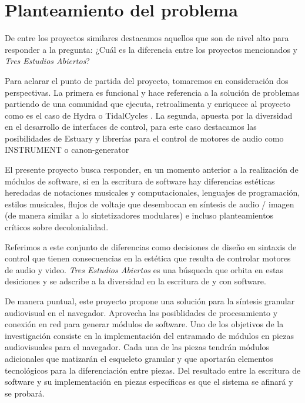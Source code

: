 \section*{Planteamiento del problema}

De entre los proyectos similares destacamos aquellos que son de nivel alto para responder a la pregunta: ¿Cuál es la diferencia entre los proyectos mencionados y \textit{Tres Estudios Abiertos}?

Para aclarar el punto de partida del proyecto, tomaremos en consideración dos perspectivas. La primera es funcional y hace referencia a la solución de problemas partiendo de una comunidad que ejecuta, retroalimenta y enriquece al proyecto como es el caso de Hydra \citep{hydra} o TidalCycles \citep{tidal}. La segunda, apuesta por la diversidad en el desarrollo de interfaces de control, para este caso destacamos las posibilidades de Estuary \citep{estuary} y librerías para el control de motores de audio como INSTRUMENT \citep{instrument} o canon-generator \citep{canongenerator}

El presente proyecto busca responder, en un momento anterior a la realización de módulos de software, si en la escritura de software hay diferencias estéticas heredadas de notaciones musicales y computacionales, lenguajes de programación,  estilos musicales, flujos de voltaje que desembocan en síntesis de audio / imagen (de manera similar a lo sintetizadores modulares) e incluso planteamientos críticos sobre decolonialidad.

Referimos a este conjunto de diferencias como decisiones de diseño en sintaxis de control que tienen consecuencias en la estética que resulta de controlar motores de audio y video. \textit{Tres Estudios Abiertos} es una búsqueda que orbita en estas desiciones y se adscribe a la diversidad en la escritura de y con software. 

De manera puntual, este proyecto propone una solución para la síntesis granular audiovisual en el navegador. Aprovecha las posiblidades de procesamiento y conexión en red para generar módulos de software. Uno de los objetivos de la investigación consiste en la implementación del entramado de módulos en piezas audiovisuales para el navegador. Cada una de las piezas tendrán módulos adicionales que matizarán el esqueleto granular y que aportarán elementos tecnológicos para la diferenciación entre piezas. Del resultado entre la escritura de software y su implementación en piezas específicas es que el sistema se afinará y se probará. 

